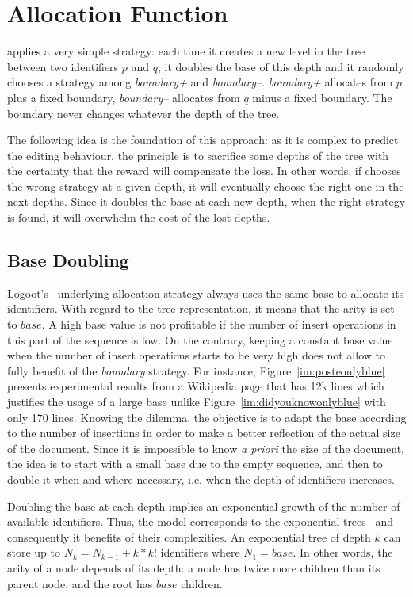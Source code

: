 \section{\NAME{} Allocation Function}
\label{sec:proposal}

\NAME{} applies a very simple strategy: each time it creates a new level in the
tree between two identifiers $p$ and $q$, it doubles the base of this depth and
it randomly chooses a strategy among \emph{boundary+} and
\emph{boundary--}. \emph{boundary+} allocates from $p$ plus a fixed boundary,
\emph{boundary--} allocates from $q$ minus a fixed boundary. The boundary never
changes whatever the depth of the tree.

The following idea is the foundation of this approach: as it is complex to
predict the editing behaviour, the principle is to sacrifice some depths of the
tree with the certainty that the reward will compensate the loss.  In other
words, if \NAME{} chooses the wrong strategy at a given depth, it will
eventually choose the right one in the next depths. Since it doubles the base
at each new depth, when the right strategy is found, it will overwhelm the
cost of the lost depths.

\subsection{Base Doubling}
Logoot's~\cite{weiss2009logoot} underlying allocation strategy always uses the
same base to allocate its identifiers. With regard to the tree representation,
it means that the arity is set to $base$. A high base value is not profitable
if the number of insert operations in this part of the sequence is low. On the
contrary, keeping a constant base value when the number of insert operations
starts to be very high does not allow to fully benefit of the \emph{boundary}
strategy. For instance, Figure~\ref{im:posteonlyblue} presents experimental
results from a Wikipedia page that has 12k lines which justifies the usage of a
large base unlike Figure~\ref{im:didyouknowonlyblue} with only 170
lines. Knowing the dilemma, the objective is to adapt the base according to the
number of insertions in order to make a better reflection of the actual size of
the document.  Since it is impossible to know \emph{a priori} the size of the
document, the idea is to start with a small base due to the empty sequence, and
then to double it when and where necessary, i.e. when the depth of identifiers
increases.

Doubling the base at each depth implies an exponential growth of the number of
available identifiers. Thus, the model corresponds to the exponential
trees~\cite{andersson2007dynamic,singh2011implementation,andersson1996faster}
and consequently it benefits of their complexities. An exponential tree of
depth $k$ can store up to $N_k=N_{k-1}+k*k!$ identifiers where $N_1=base$.  In
other words, the arity of a node depends of its depth: a node has twice more
children than its parent node, and the root has $base$ children.

